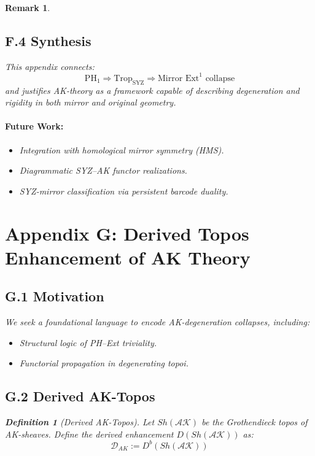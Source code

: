 \documentclass[11pt]{article}
\newtheorem{definition}[theorem]{Definition}
\newtheorem{remark}[theorem]{Remark}
\begin{document}
\begin{remark}
\subsection*{F.4 Synthesis}

This appendix connects:
\[
\mathrm{PH}_1 \Rightarrow \mathrm{Trop}_{\mathrm{SYZ}} \Rightarrow \text{Mirror } \mathrm{Ext}^1 \text{ collapse}
\]
and justifies AK-theory as a framework capable of describing degeneration and rigidity in both mirror and original geometry.

\paragraph{Future Work:}
\begin{itemize}
  \item Integration with homological mirror symmetry (HMS).
  \item Diagrammatic SYZ–AK functor realizations.
  \item SYZ-mirror classification via persistent barcode duality.
\end{itemize}



\section*{Appendix G: Derived Topos Enhancement of AK Theory}

\subsection*{G.1 Motivation}
We seek a foundational language to encode AK-degeneration collapses, including:
\begin{itemize}
  \item Structural logic of PH–Ext triviality.
  \item Functorial propagation in degenerating topoi.
\end{itemize}

\subsection*{G.2 Derived AK-Topos}

\begin{definition}[Derived AK-Topos]
Let $Sh(\mathcal{AK})$ be the Grothendieck topos of AK-sheaves.  
Define the derived enhancement $D(Sh(\mathcal{AK}))$ as:
\[
\mathcal{D}_{AK} := D^b(Sh(\mathcal{AK}))
\]
\end{definition}


\end{remark}
\end{document}
